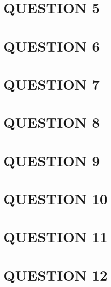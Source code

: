\documentclass[a4paper]{article}
\begin{document}
\section{QUESTION 5}
\section{QUESTION 6}
\section{QUESTION 7}
\section{QUESTION 8}
\section{QUESTION 9}
\section{QUESTION 10}
\section{QUESTION 11}
\section{QUESTION 12}
\end{document}
